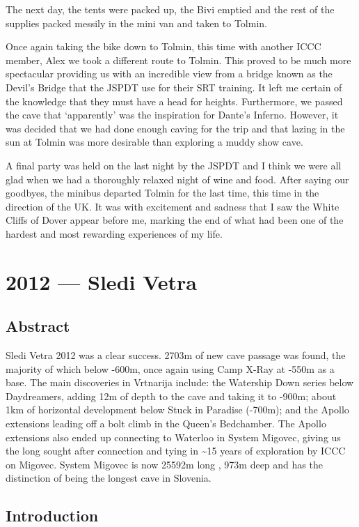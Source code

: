 The next day, the tents were packed up, the Bivi emptied and the rest of
the supplies packed messily in the mini van and taken to Tolmin.

Once again taking the bike down to Tolmin, this time with another ICCC
member, Alex we took a different route to Tolmin. This proved to be much
more spectacular providing us with an incredible view from a bridge
known as the Devil's Bridge that the JSPDT use for their SRT training.
It left me certain of the knowledge that they must have a head for
heights. Furthermore, we passed the cave that `apparently' was the
inspiration for Dante's Inferno. However, it was decided that we had
done enough caving for the trip and that lazing in the sun at Tolmin was
more desirable than exploring a muddy show cave.

A final party was held on the last night by the JSPDT and I think we
were all glad when we had a thoroughly relaxed night of wine and food.
After saying our goodbyes, the minibus departed Tolmin for the last
time, this time in the direction of the UK. It was with excitement and
sadness that I saw the White Cliffs of Dover appear before me, marking
the end of what had been one of the hardest and most rewarding
experiences of my life.

\chapter{2012 --- Sledi Vetra}\label{sledi-vetra}

\section{Abstract}\label{abstract}

Sledi Vetra 2012 was a clear success. 2703m of new cave passage was
found, the majority of which below -600m, once again using Camp X-Ray at
-550m as a base. The main discoveries in Vrtnarija include: the
Watership Down series below Daydreamers, adding 12m of depth to the cave
and taking it to -900m; about 1km of horizontal development below Stuck
in Paradise (-700m); and the Apollo extensions leading off a bolt climb
in the Queen's Bedchamber. The Apollo extensions also ended up
connecting to Waterloo in System Migovec, giving us the long sought
after connection and tying in \textasciitilde{}15 years of exploration
by ICCC on Migovec. System Migovec is now 25592m long , 973m deep and
has the distinction of being the longest cave in Slovenia.

\section{Introduction}\label{introduction-3}

